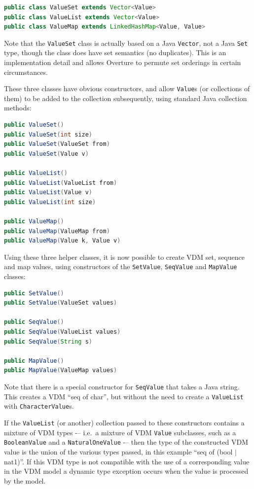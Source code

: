 \documentclass{overturerepchap}
\newcommand{\kw}[1]{{\textbf\ttfamily #1}}
\begin{document}
\begin{lstlisting}[language=JAVA]
public class ValueSet extends Vector<Value>
public class ValueList extends Vector<Value>
public class ValueMap extends LinkedHashMap<Value, Value>
\end{lstlisting}

Note that the \texttt{ValueSet} class is actually based on a Java \texttt{Vector}, not a Java \texttt{Set} type, though the class does have set semantics (no duplicates). This is an implementation detail and allows Overture to permute set orderings in certain circumstances.

These three classes have obvious constructors, and allow \texttt{Value}s (or collections of them) to be added to the collection subsequently, using standard Java collection methods:

\begin{lstlisting}[language=JAVA]
public ValueSet()
public ValueSet(int size)
public ValueSet(ValueSet from)
public ValueSet(Value v)

public ValueList()
public ValueList(ValueList from)
public ValueList(Value v)
public ValueList(int size)

public ValueMap()
public ValueMap(ValueMap from)
public ValueMap(Value k, Value v)
\end{lstlisting}

Using these three helper classes, it is now possible to create VDM set, sequence and map values, using constructors of the \texttt{SetValue}, \texttt{SeqValue} and \texttt{MapValue} classes:

\begin{lstlisting}[language=JAVA]
public SetValue()
public SetValue(ValueSet values)

public SeqValue()
public SeqValue(ValueList values)
public SeqValue(String s)

public MapValue()
public MapValue(ValueMap values)
\end{lstlisting}

Note that there is a special constructor for \texttt{SeqValue} that takes a Java string. This creates a VDM ``\kw{seq of char}'', but without the need to create a \texttt{ValueList} with \texttt{CharacterValue}s.

If the \texttt{ValueList} (or another) collection passed to these constructors contains a mixture of VDM types -– i.e.\ a mixture of VDM \texttt{Value} subclasses, such as a \texttt{BooleanValue} and a \texttt{NaturalOneValue} -– then the type of the constructed VDM value is the union of the various types passed, in this example ``\kw{seq of (bool} \texttt{$\mid$} \kw{nat1)}''. If this VDM type is not compatible with the use of a corresponding value in the VDM model a dynamic type exception occurs when the value is processed by the model.
\end{document}
